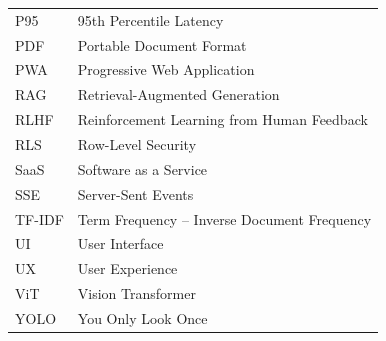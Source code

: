 \begin{longtable}{ll}
    P95    & 95th Percentile Latency \\
    PDF    & Portable Document Format \\
    PWA    & Progressive Web Application \\
    RAG    & Retrieval-Augmented Generation \\
    RLHF   & Reinforcement Learning from Human Feedback \\
    RLS    & Row-Level Security \\
    SaaS   & Software as a Service \\
    SSE    & Server-Sent Events \\
    TF-IDF & Term Frequency -- Inverse Document Frequency \\
    UI     & User Interface \\
    UX     & User Experience \\
    ViT    & Vision Transformer \\
    YOLO   & You Only Look Once \\
\end{longtable}